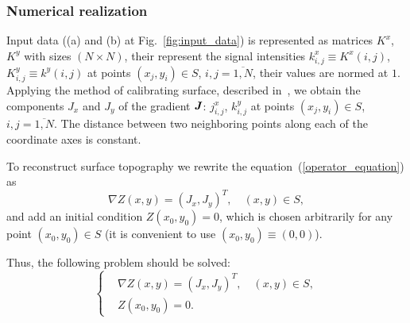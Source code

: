 \documentclass{beamer}
\begin{document}
\begin{frame}[c,allowframebreaks]
    \frametitle{Numerical realization}

    Input data ((a) and (b) at Fig.~\ref{fig:input_data}) is represented as matrices $K^x$, $K^y$
    with sizes $(N \times N)$, their represent the signal intensities $k^x_{i,j} \equiv K^x (i,j)$,
    $K^y_{i,j} \equiv k^y (i,j)$ at points $(x_j, y_i) \in S$, $i,j = \overline{1,N}$, their values
    are normed at $1$. Applying the method of calibrating surface, described in~\cite{main},
    we obtain the components $J_x$ and $J_y$ of the gradient ${\textbf{\emph{J}}}$: $j^x_{i,j}$,
    $k^y_{i,j}$ at points $(x_j, y_i) \in S$, $i,j = \overline{1,N}$.
    The distance between two neighboring points along each of the coordinate axes is constant.

    To reconstruct surface topography we rewrite the equation~(\ref{operator_equation}) as
    $$ \nabla Z(x,y) = (J_x, J_y)^T, \quad (x,y)\in S,$$
    and add an initial condition $Z(x_0,y_0) = 0$, which is chosen arbitrarily for any point
    $(x_0,y_0) \in S$ (it is convenient to use $(x_0,y_0) \equiv (0,0)$).

    \framebreak

    Thus, the following problem should be solved:
    \begin{equation}
        \label{system_of_equations}
        \left\{
            \begin{aligned}
                &\nabla Z(x,y) = (J_x, J_y)^T, \quad (x,y)\in S, \\
                &Z(x_0,y_0) = 0.
            \end{aligned}
        \right.
    \end{equation}

    \framebreak


\end{frame}
\end{document}
